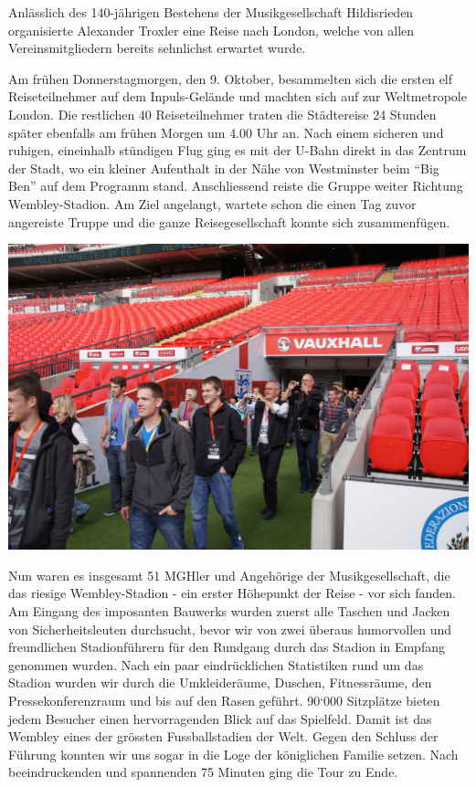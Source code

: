 \begin{history}

    Anlässlich des 140-jährigen Bestehens der Musikgesellschaft Hildisrieden
    organisierte Alexander Troxler eine Reise nach London, welche von allen
    Vereinsmitgliedern bereits sehnlichst erwartet wurde.

    Am frühen Donnerstagmorgen, den 9. Oktober, besammelten sich die ersten elf
    Reiseteilnehmer auf dem Inpuls-Gelände und machten sich auf zur
    Weltmetropole London. Die restlichen 40 Reiseteilnehmer traten die
    Städtereise 24 Stunden später ebenfalls am frühen Morgen um 4.00 Uhr an.
    Nach einem sicheren und ruhigen, eineinhalb stündigen Flug ging es mit der
    U-Bahn direkt in das Zentrum der Stadt, wo ein kleiner Aufenthalt in der
    Nähe von Westminster beim \enquote{Big Ben} auf dem Programm stand.
    Anschliessend reiste die Gruppe weiter Richtung Wembley-Stadion. Am Ziel
    angelangt, wartete schon die einen Tag zuvor angereiste Truppe und die ganze
    Reisegesellschaft konnte sich zusammenfügen.

    \begin{MulticolFigure}
        \centering
        \includegraphics[width=0.93\linewidth]{./chap/2001-2024/2014/Einmarsch-Wembley.jpg}
    \end{MulticolFigure}

    Nun waren es insgesamt 51 MGHler und Angehörige der Musikgesellschaft, die
    das riesige Wembley-Stadion - ein erster Höhepunkt der Reise - vor sich
    fanden. Am Eingang des imposanten Bauwerks wurden zuerst alle Taschen und
    Jacken von Sicherheitsleuten durchsucht, bevor wir von zwei überaus
    humorvollen und freundlichen Stadionführern für den Rundgang durch das
    Stadion in Empfang genommen wurden. Nach ein paar eindrücklichen Statistiken
    rund um das Stadion wurden wir durch die Umkleideräume, Duschen,
    Fitnessräume, den Pressekonferenzraum und bis auf den Rasen geführt. 90`000
    Sitzplätze bieten jedem Besucher einen hervorragenden Blick auf das
    Spielfeld. Damit ist das Wembley eines der grössten Fussballstadien der
    Welt. Gegen den Schluss der Führung konnten wir uns sogar in die Loge der
    königlichen Familie setzen. Nach beeindruckenden und spannenden 75 Minuten
    ging die Tour zu Ende.


\end{history}
